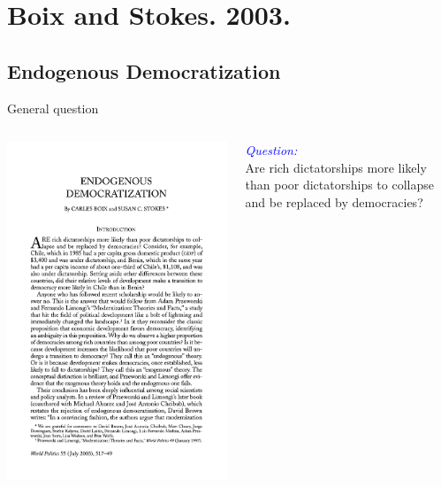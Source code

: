\documentclass[xcolor=dvipsnames]{beamer}
\begin{document}
	
	\section{Boix and Stokes. 2003.}
	\subsection{Endogenous Democratization}
	
	\begin{frame}[fragile]{General question}
		\begin{columns}[T]
			\begin{column}{0.4\textwidth}
				\includegraphics[width=0.8\linewidth]{BoixStokes2003.png}
			\end{column}
			
			\begin{column}{0.56\textwidth}
				\begin{center}
					\textit{\textcolor{blue}{Question:}}\\ \pause
					\bigskip		
					Are rich dictatorships more likely than poor dictatorships to collapse and be replaced by democracies? 
				\end{center}
			\end{column}
		\end{columns}
	\end{frame}
	
\end{document}
